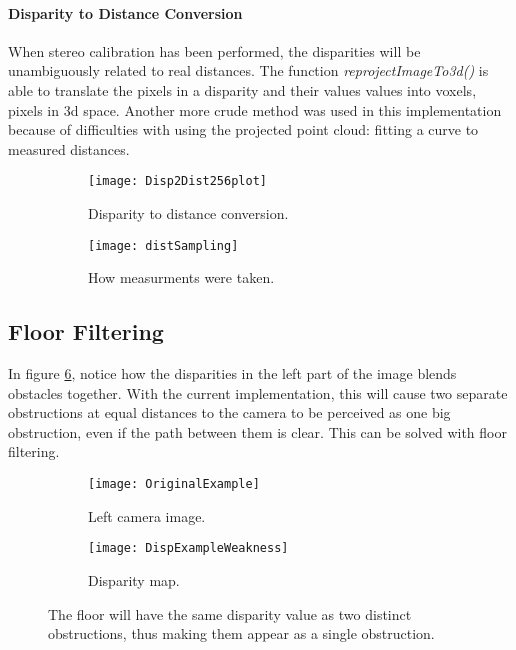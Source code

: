 \paragraph{Disparity to Distance Conversion}

When stereo calibration has been performed, the disparities will be unambiguously related to real distances. The function \textit{reprojectImageTo3d()}\cite{3dCalibRec} is able to translate the pixels in a disparity and their values values into voxels, pixels in 3d space. Another more crude method was used in this implementation because of difficulties with using the projected point cloud: fitting a curve to measured distances. 

\begin{figure}
	\centering
	\begin{subfigure}[b]{0.80\textwidth}
		\texttt{[image: Disp2Dist256plot]}
		\caption{Disparity to distance conversion.}
		\label{fig:OriginalExample2}
	\end{subfigure}
	\begin{subfigure}[b]{0.60\textwidth}
		\texttt{[image: distSampling]}
		\caption{How measurments were taken.}
		\label{fig:DispExampleWeakness}
	\end{subfigure}
	\caption{\label{fig:distanceWeakness}}
\end{figure}

\subsection{Floor Filtering}

In figure \ref{fig:distanceWeakness}, notice how the disparities in the left part of the image blends obstacles together. With the current implementation, this will cause two separate obstructions at equal distances to the camera to be perceived as one big obstruction, even if the path between them is clear. This can be solved with floor filtering.

\begin{figure}
	\centering
	\begin{subfigure}[b]{0.48\textwidth}
		\texttt{[image: OriginalExample]}
		\caption{Left camera image.}
		\label{fig:OriginalExample2}
	\end{subfigure}
	\begin{subfigure}[b]{0.48\textwidth}
		\texttt{[image: DispExampleWeakness]}
		\caption{Disparity map.}
		\label{fig:DispExampleWeakness}
	\end{subfigure}
	\caption{\label{fig:distanceWeakness}The floor will have the same disparity value as two distinct obstructions, thus making them appear as a single obstruction.}
\end{figure}


